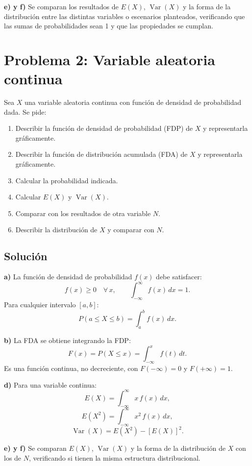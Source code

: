 \documentclass[12pt]{article}
\begin{document}
\textbf{e) y f)} Se comparan los resultados de $E(X)$, $\operatorname{Var}(X)$ y la forma de la distribución entre las distintas variables o escenarios planteados, verificando que las sumas de probabilidades sean 1 y que las propiedades se cumplan.

\section{Problema 2: Variable aleatoria continua}

Sea $X$ una variable aleatoria continua con función de densidad de probabilidad dada. Se pide:

\begin{enumerate}[label=\alph*)]
    \item Describir la función de densidad de probabilidad (FDP) de $X$ y representarla gráficamente.
    \item Describir la función de distribución acumulada (FDA) de $X$ y representarla gráficamente.
    \item Calcular la probabilidad indicada.
    \item Calcular $E(X)$ y $\operatorname{Var}(X)$.
    \item Comparar con los resultados de otra variable $N$.
    \item Describir la distribución de $X$ y comparar con $N$.
\end{enumerate}

\subsection{Solución}

\textbf{a)} La función de densidad de probabilidad $f(x)$ debe satisfacer:
$$f(x) \geq 0 \quad \forall\, x, \qquad \int_{-\infty}^{\infty} f(x)\,dx = 1.$$
Para cualquier intervalo $[a,b]$:
$$P(a \leq X \leq b) = \int_a^b f(x)\,dx.$$

\textbf{b)} La FDA se obtiene integrando la FDP:
$$F(x) = P(X \leq x) = \int_{-\infty}^{x} f(t)\,dt.$$
Es una función continua, no decreciente, con $F(-\infty)=0$ y $F(+\infty)=1$.

\textbf{d)} Para una variable continua:
$$E(X) = \int_{-\infty}^{\infty} x\, f(x)\,dx,$$
$$E(X^2) = \int_{-\infty}^{\infty} x^2\, f(x)\,dx,$$
$$\operatorname{Var}(X) = E(X^2) - [E(X)]^2.$$

\textbf{e) y f)} Se comparan $E(X)$, $\operatorname{Var}(X)$ y la forma de la distribución de $X$ con los de $N$, verificando si tienen la misma estructura distribucional.
\end{document}
